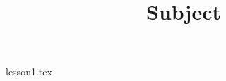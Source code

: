 \documentclass{style/lectionstyle}
\title{Subject}
\begin{document}
    \maketitle
    \newpage
    \tableofcontents
    \newpage
    {lesson1.tex}
\end{document}
